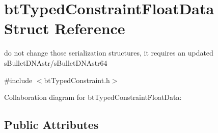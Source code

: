 \hypertarget{structbt_typed_constraint_float_data}{\section{bt\+Typed\+Constraint\+Float\+Data Struct Reference}
\label{structbt_typed_constraint_float_data}
}


do not change those serialization structures, it requires an updated s\+Bullet\+D\+N\+Astr/s\+Bullet\+D\+N\+Astr64  




{\ttfamily \#include $<$bt\+Typed\+Constraint.\+h$>$}



Collaboration diagram for bt\+Typed\+Constraint\+Float\+Data\+:
\subsection*{Public Attributes}
